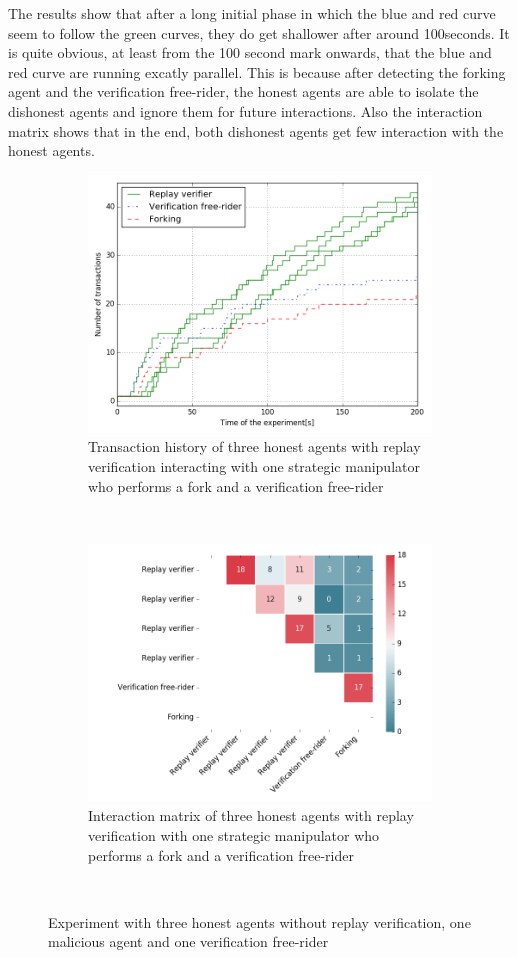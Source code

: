 The results show that after a long initial phase in which the blue and red curve seem to follow 
the green curves, they do get shallower after around 100seconds. It is quite obvious, at least 
from the 100 second mark onwards, that the blue and red curve are running excatly parallel. This is
because after detecting the forking agent and the verification free-rider, the honest agents are 
able to isolate the dishonest agents and ignore them for future interactions. Also the interaction
matrix shows that in the end, both dishonest agents get few interaction with the honest agents. 

\begin{figure}[h!]
    \begin{subfigure}{\textwidth}
      \centering
      \includegraphics[width=.6\linewidth]{images/verification_doublespending}
      \caption{Transaction history of three honest agents with replay verification interacting with one strategic manipulator who performs a fork and a verification free-rider}
      \label{fig:verification_doublespending}
    \end{subfigure}\\
    \begin{subfigure}{\textwidth}
      \centering
      \includegraphics[width=.6\linewidth]{images/verification_doublespending_matrix}
      \caption{Interaction matrix of three honest agents with replay verification with one strategic manipulator who performs a fork and a verification free-rider}
      \label{fig:verification_doublespending_matrix}
    \end{subfigure}\\
    \caption{Experiment with three honest agents without replay verification, one malicious agent 
    and one verification free-rider}
    \label{fig:verification_doublespend_combined}
\end{figure}
